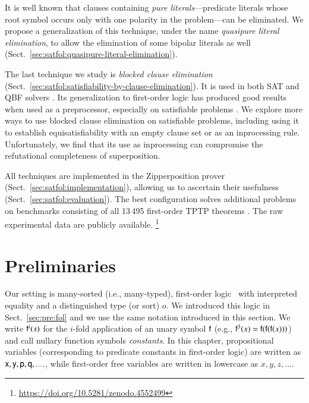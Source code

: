 \begin{qle}
It is well known that clauses containing \emph{pure literals}---predicate
literals whose root symbol occurs only with one polarity in the problem---can
be eliminated. We propose a generalization of this technique, under the name
\emph{quasipure literal elimination}, to allow the elimination of some bipolar
literals as well (Sect.~\ref{sec:satfol:quasipure-literal-elimination}).
\end{qle}

The last technique we study is \emph{blocked clause elimination} (Sect.\
\ref{sec:satfol:satisfiability-by-clause-elimination}). It is used in both SAT
\cite{jbh-10-BCE} and QBF solvers \cite{bls-11-bloqqer}. Its generalization to first-order
logic has produced good results when used as a preprocessor, especially on
satisfiable problems \cite{ksstb-2017-blockedfol}. We explore more ways to use
blocked clause elimination on satisfiable problems, including using it to
establish equisatisfiability with an empty clause set or as an inprocessing
rule. Unfortunately, we find that its use as inprocessing can compromise the
refutational completeness of superposition.


All techniques are implemented in the Zipperposition prover
(Sect.~\ref{sec:satfol:implementation}), allowing us to ascertain their usefulness
(Sect.~\ref{sec:satfol:evaluation}). The best configuration solves \NumberOK{160}
additional problems on benchmarks consisting of all 13\,495 first-order TPTP theorems
\cite{gs-17-tptp}. The raw experimental data are publicly available.%
\footnote{\url{https://doi.org/10.5281/zenodo.4552499}}

\section{Preliminaries}
\label{sec:satfol:preliminaries}

Our setting is many-sorted (i.e., many-typed), first-order
logic~\cite{jg-1987-logic-textbook} with interpreted equality and a
distinguished type (or sort) $o$. We introduced this logic in
Sect.~\ref{sec:pre:fol} and we use the same notation introduced in this section.
We write $\mathsf{f}^i(s)$ for the $i$-fold application of an unary symbol
$\mathsf{f}$ (e.g., $\mathsf{f}^3(x) = \mathsf{f}(\mathsf{f}(\mathsf{f}(x)))$) and call nullary
function symbols \emph{constants}. In this chapter, propositional variables
(corresponding to predicate constants in first-order logic) are written as
$\mathsf{x}, \mathsf{y}, \mathsf{p}, \mathsf{q}, \ldots$, while first-order free variables
are written in lowercase as $x,y,z,\ldots$.

